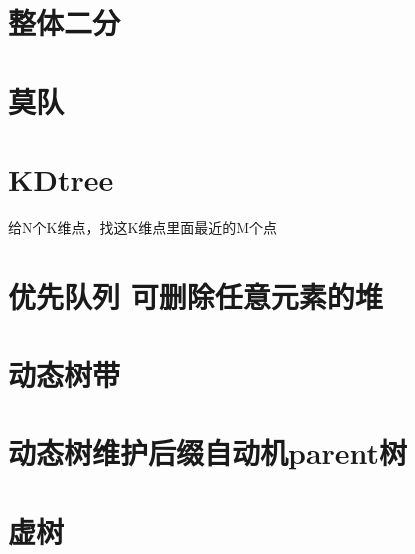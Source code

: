 \documentclass[main.tex]{subfiles}
\begin{document}
\section{整体二分}
    
\section{莫队}
    
\section{KDtree}
    给N个K维点，找这K维点里面最近的M个点
    
\section{优先队列 可删除任意元素的堆}
    
\section{动态树带}
    
\section{动态树维护后缀自动机parent树}
    
\section{虚树}
    
\end{document}
